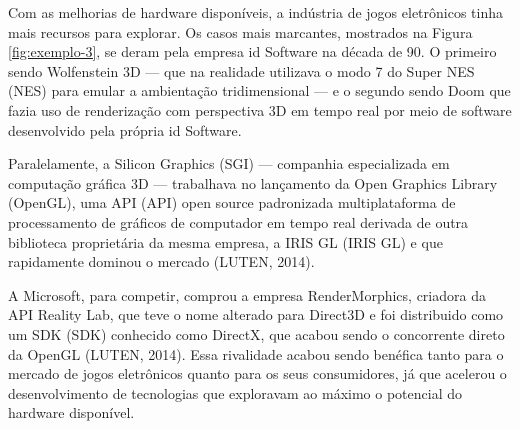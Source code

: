 Com as melhorias de hardware disponíveis, a indústria de jogos eletrônicos tinha mais recursos para explorar. Os casos mais marcantes, mostrados na Figura \ref{fig:exemplo-3}, se deram pela empresa id Software na década de 90. O primeiro sendo Wolfenstein 3D --- que na realidade utilizava o modo 7 do Super NES (\acrlong{NES}) para emular a ambientação tridimensional --- e o segundo sendo Doom que fazia uso de renderização com perspectiva 3D em tempo real por meio de software desenvolvido pela própria id Software.
	
    \begin{figure}[h]
		\centering
	\end{figure}
	\nocite{figura3}
	
Paralelamente, a Silicon Graphics (\acrshort{SGI}) --- companhia especializada em computação gráfica 3D --- trabalhava no lançamento da Open Graphics Library (\acrshort{OpenGL}), uma API (\acrlong{API}) open source padronizada multiplataforma de processamento de gráficos de computador em tempo real derivada de outra biblioteca proprietária da mesma empresa, a IRIS GL (\acrlong{IRIS GL}) e que rapidamente dominou o mercado (LUTEN, 2014)\nocite{openGLBook}. 

A Microsoft, para competir, comprou a empresa RenderMorphics, criadora da \acrshort{API} Reality Lab, que teve o nome alterado para Direct3D e foi distribuido como um SDK (\acrlong{SDK}) conhecido como DirectX, que acabou sendo o concorrente direto da \acrshort{OpenGL} (LUTEN, 2014)\nocite{openGLBook}. Essa rivalidade acabou sendo benéfica tanto para o mercado de jogos eletrônicos quanto para os seus consumidores, já que acelerou o desenvolvimento de tecnologias que exploravam ao máximo o potencial do hardware disponível.
	
